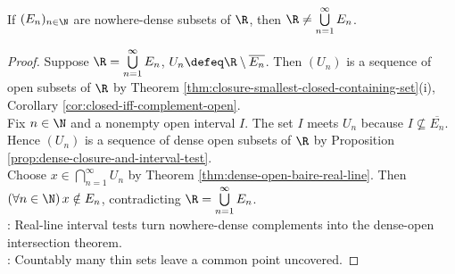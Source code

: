 \begin{theorem} \label{thm:baire-category-real-line} \\
If $(E_n)_{n\in\N}$ are nowhere-dense subsets of $\R$, then $\R\ne\bigcup\limits_{n=1}^{\infty}E_n$.
\begin{proof}
Suppose $\R=\bigcup\limits_{n=1}^{\infty}E_n$, $U_n\defeq\R\setminus\overline{E_n}$. Then $(U_n)$ is a sequence of open subsets of $\R$ by Theorem \ref{thm:closure-smallest-closed-containing-set}(i), Corollary \ref{cor:closed-iff-complement-open}.\\
Fix $n\in\N$ and a nonempty open interval $I$. The set $I$ meets $U_n$ because $I\nsubseteq\overline{E_n}$.\\
Hence $(U_n)$ is a sequence of dense open subsets of $\R$ by Proposition \ref{prop:dense-closure-and-interval-test}.\\
Choose $x\in\bigcap\limits_{n=1}^{\infty}U_n$ by Theorem \ref{thm:dense-open-baire-real-line}. Then $(\forall n\in\N)\,x\notin E_n$, contradicting $\R=\bigcup\limits_{n=1}^{\infty}E_n$.\\
: Real-line interval tests turn nowhere-dense complements into the dense-open intersection theorem.\\
: Countably many thin sets leave a common point uncovered.
\end{proof}
\end{theorem}

